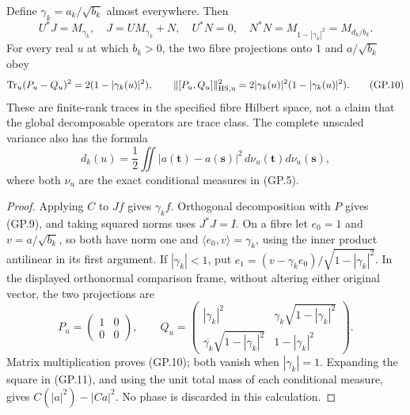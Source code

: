 \begin{theorem}
Define $\gamma_k=a_k/\sqrt{b_k}$ almost everywhere. Then
\begin{equation}
 U^*J=M_{\gamma_k},\quad
 J=UM_{\gamma_k}+N,\quad U^*N=0,\quad
 N^*N=M_{1-|\gamma_k|^2}=M_{d_k/b_k}.
 \tag{GP.9}
\end{equation}
For every real $u$ at which $b_k>0$, the two fibre projections onto
$1$ and $a/\sqrt{b_k}$ obey
\begin{equation}
 \operatorname{Tr}_{u}(P_u-Q_u)^2=2(1-|\gamma_k(u)|^2),\qquad
 \|[P_u,Q_u]\|_{\rm HS,u}^2
       =2|\gamma_k(u)|^2(1-|\gamma_k(u)|^2).
 \tag{GP.10}
\end{equation}
These are finite-rank traces in the specified fibre Hilbert space,
not a claim that the global decomposable operators are trace class.
The complete unscaled variance also has the formula
\begin{equation}
 d_k(u)=\frac12\iint|a(\mathbf t)-a(\mathbf s)|^2
                       \,d\nu_u(\mathbf t)d\nu_u(\mathbf s),
 \tag{GP.11}
\end{equation}
where both $\nu_u$ are the exact conditional measures in (GP.5).
\end{theorem}
\begin{proof}
Applying $C$ to $Jf$ gives $\gamma_k f$. Orthogonal decomposition
with $P$ gives (GP.9), and taking squared norms uses $J^*J=I$.
On a fibre let $e_0=1$ and $v=a/\sqrt{b_k}$, so both have norm
one and $\langle e_0,v\rangle=\gamma_k$, using the inner product
antilinear in its first argument. If $|\gamma_k|<1$, put
$e_1=(v-\gamma_ke_0)/\sqrt{1-|\gamma_k|^2}$. In the displayed
orthonormal comparison frame, without altering either original
vector, the two projections are
\[
 P_u=\begin{pmatrix}1&0\\0&0\end{pmatrix},\qquad
 Q_u=\begin{pmatrix}
 |\gamma_k|^2&\gamma_k\sqrt{1-|\gamma_k|^2}\\
 \overline{\gamma_k}\sqrt{1-|\gamma_k|^2}&1-|\gamma_k|^2
 \end{pmatrix}.
\]
Matrix multiplication proves (GP.10); both vanish when
$|\gamma_k|=1$. Expanding the square in (GP.11), and using the
unit total mass of each conditional measure, gives
$C(|a|^2)-|Ca|^2$. No phase is discarded in this calculation.
\end{proof}

